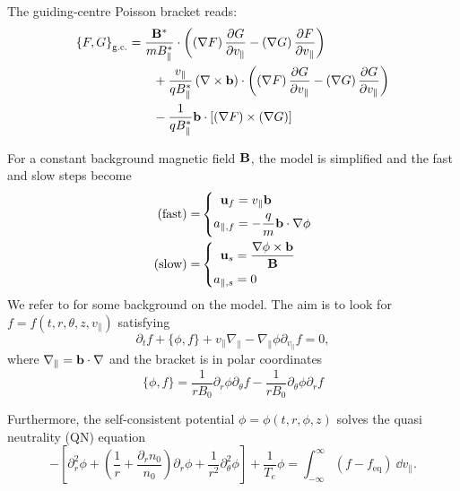 The guiding-centre Poisson bracket reads:
\begin{subequations}
	\begin{align}
		\left\{ F, G \right\}_{\text{g.c.}} & = \frac{\mathbf{B}^\ast}{m B_\parallel^\ast} \cdot \left( \left(\nabla F\right) \frac{\partial G}{\partial v_\parallel} - \left(\nabla G\right) \frac{\partial F}{\partial v_\parallel} \right) \label{gc Pb part 1} \\
		& \qquad + \frac{v_\parallel}{q B_\parallel^\ast} \left( \nabla \times \mathbf{b} \right) \cdot \left( \left(\nabla F\right) \frac{\partial G}{\partial v_\parallel} - \left(\nabla G\right) \frac{\partial G}{\partial v_\parallel} \right) \label{gc Pb part 2} \\
		& \qquad - \frac{1}{q B_\parallel^\ast} \mathbf{b} \cdot \left[\left(\nabla F\right) \times \left(\nabla G\right)\right] \label{gc Pb part 3}
	\end{align}
\end{subequations}

For a constant background magnetic field $\mathbf{B}$, the model is simplified and the fast and slow steps become 
\begin{subequations}
	\begin{align}
		(\text{fast}) = & \left\{ \begin{aligned}
			\mathbf{u}_f & = {v_\parallel} \mathbf{b} \\
			a_{\parallel, f} & = -\frac{q}{m} \mathbf{b} \cdot \nabla \phi
		\end{aligned} \right. \label{split step fast const B}\\
		(\text{slow}) = &  \left\{ \begin{aligned}
			\mathbf{u}_s & = \frac{\nabla \phi\times \mathbf{b}}{\mathbf{B}}  \\
			a_{\parallel, s} & = 0
		\end{aligned} \right. \label{split step slow const B}
	\end{align}
\end{subequations}
We refer to \cite{Latu_2017} for some background on the model. The aim is to look for $f = f(t, r, \theta, z, v_\parallel)$ satisfying
\[ \partial_t f + \{\phi, f\} + v_\parallel \nabla_\parallel - \nabla_\parallel \phi \partial_{v_\parallel}f = 0, \]
where $\nabla_\parallel = \mathbf{b} \cdot \nabla$ and the bracket is in polar coordinates
\[ \{\phi, f \} = \frac{1}{rB_0}\partial_r \phi\partial_\theta f -\frac{1}{rB_0}\partial_\theta \phi\partial_r f \]

Furthermore, the self-consistent potential $\phi = \phi(t, r, \phi, z)$ solves the quasi neutrality (QN) equation
\[- \left[\partial_r^2 \phi + \left( \frac{1}{r} + \frac{\partial_r n_0}{n_0}\right)\partial_r \phi + \frac{1}{r^2} \partial_\theta^2 \phi \right] + \frac{1}{T_e} \phi = \int_{-\infty}^{\infty} (f - f_\text{eq}) \ \dd v_\parallel .\]

